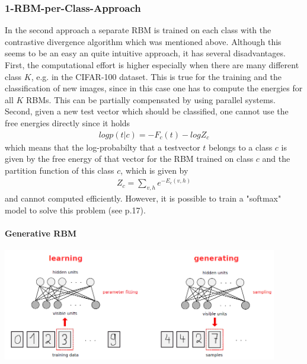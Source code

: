 \documentclass[a4paper]{scrartcl}
\begin{document}
\subsubsection{1-RBM-per-Class-Approach}
In the second approach a separate RBM is trained on each class with the contrastive divergence algorithm which was mentioned above. Although this seems to be an easy an quite intuitive approach, it has several disadvantages. First, the computational effort is higher especially when there are many different class $K$, e.g. in the CIFAR-100 dataset. This is true for the training and the classification of new images, since in this case one has to compute the energies for all $K$ RBMs. This can be partially compensated by using parallel systems. Second, given a new test vector which should be classified, one cannot use the free energies directly since it holds
\begin{align*}
log p(t|c) = -F_c(t) - log Z_c
\end{align*}
which means that the log-probabilty that a testvector $t$ belongs to a class $c$ is given by the free energy of that vector for the RBM trained on class $c$ and the partition function of this class $c$, which is given by
\begin{align}
Z_c = \sum_{v,h} e^{-E_c(v,h)}
\end{align}
and cannot computed efficiently. However, it is possible to train a "softmax" model to solve this problem (see \cite{Hinton} p.17).

\paragraph{Generative RBM}
\begin{center}
\includegraphics[width=12cm]{images/generativeRBM.png}
\end{center}
\end{document}
